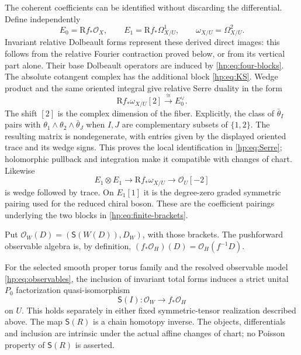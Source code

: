 The coherent coefficients can be identified without discarding
the differential. Define independently
\[
 E_0=\mathrm Rf_*\mathcal O_X,\qquad
 E_1=\mathrm Rf_*\Omega^1_{X/U},\qquad
 \omega_{X/U}=\Omega^2_{X/U}.
\]
Invariant relative Dolbeault forms represent these derived direct
images: this follows from the relative Fourier contraction proved
below, or from its vertical part alone. Their base Dolbeault
operators are induced by \eqref{hp:eq:four-blocks}. The absolute
cotangent complex has the additional block \eqref{hp:eq:KS}.
Wedge product and the same oriented integral give relative Serre
duality in the form
\begin{equation}\label{hp:eq:Serre}
 \mathrm Rf_*\omega_{X/U}[2]\xrightarrow{\ \cong\ }E_0^\vee.
\end{equation}
The shift $[2]$ is the complex dimension of the fiber. Explicitly,
the class of $\bar\theta_I$ pairs with
$\theta_1\wedge\theta_2\wedge\bar\theta_J$ when $I,J$ are
complementary subsets of $\{1,2\}$. The resulting matrix is
nondegenerate, with entries given by the displayed oriented trace
and its wedge signs. This proves the local identification in
\eqref{hp:eq:Serre}; holomorphic pullback and integration make it
compatible with changes of chart. Likewise
\[
 E_1\otimes E_1\longrightarrow
 \mathrm Rf_*\omega_{X/U}\longrightarrow\mathcal O_U[-2]
\]
is wedge followed by trace. On $E_1[1]$ it is the degree-zero
graded symmetric pairing used for the reduced chiral boson.
These are the coefficient pairings underlying the two blocks
in \eqref{hp:eq:finite-brackets}.

Put $\mathcal O_W(D)=(\mathsf S(W(D)),D_W)$, with those brackets.
The pushforward observable algebra is, by definition,
$(f_*\mathcal O_H)(D)=\mathcal O_H(f^{-1}D)$.

\begin{theorem}
\label{hp:thm:comparison}
For the selected smooth proper torus family and the resolved
observable model \eqref{hp:eq:observables}, the inclusion of invariant
total forms induces a strict unital $P_0$ factorization
quasi-isomorphism
\begin{equation}\label{hp:eq:main}
 \mathsf S(I):\mathcal O_W\longrightarrow f_*\mathcal O_H
\end{equation}
on $U$. This holds separately in either fixed symmetric-tensor
realization described above. The map $\mathsf S(R)$ is a chain
homotopy inverse. The objects, differentials and inclusion are
intrinsic under the actual affine changes of chart; no Poisson
property of $\mathsf S(R)$ is asserted.
\end{theorem}

